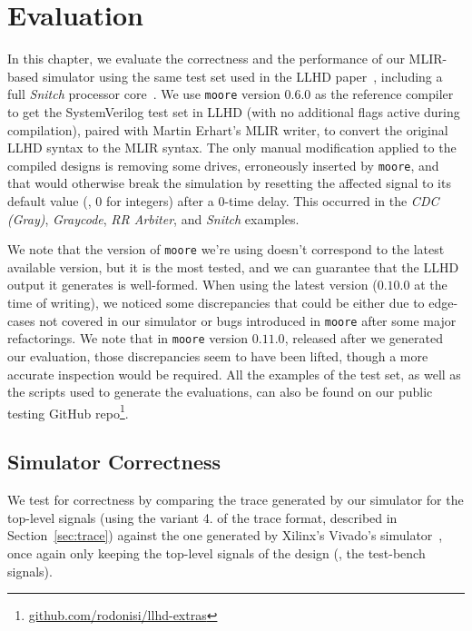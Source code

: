 \chapter{Evaluation}
\label{ch:eval}

In this chapter, we evaluate the correctness and the performance of our MLIR-based simulator using the same test set used in the LLHD paper~\cite{Schuiki2020}, including a full \textit{Snitch} processor core~\cite{Zaruba2020}. We use \texttt{moore} version $0.6.0$ as the reference compiler to get the SystemVerilog test set in LLHD (with no additional flags active during compilation), paired with Martin Erhart's MLIR writer, to convert the original LLHD syntax to the MLIR syntax. The only manual modification applied to the compiled designs is removing some drives, erroneously inserted by \texttt{moore}, and that would otherwise break the simulation by resetting the affected signal to its default value (\eg, $0$ for integers) after a $0$-time delay. This occurred in the \textit{CDC (Gray)}, \textit{Graycode}, \textit{RR Arbiter}, and \textit{Snitch} examples.

We note that the version of \texttt{moore} we're using doesn't correspond to the latest available version, but it is the most tested, and we can guarantee that the LLHD output it generates is well-formed. When using the latest version ($0.10.0$ at the time of writing), we noticed some discrepancies that could be either due to edge-cases not covered in our simulator or bugs introduced in \texttt{moore} after some major refactorings. We note that in \texttt{moore} version $0.11.0$, released after we generated our evaluation, those discrepancies seem to have been lifted, though a more accurate inspection would be required. All the examples of the test set, as well as the scripts used to generate the evaluations, can also be found on our public testing GitHub repo\footnote{\url{github.com/rodonisi/llhd-extras}}.


\section{Simulator Correctness}
\label{sec:correctness}
We test for correctness by comparing the trace generated by our simulator for the top-level signals (using the variant 4. of the trace format, described in Section~\ref{sec:trace}) against the one generated by Xilinx's Vivado's simulator~\cite{vivado}, once again only keeping the top-level signals of the design (\ie, the test-bench signals).

